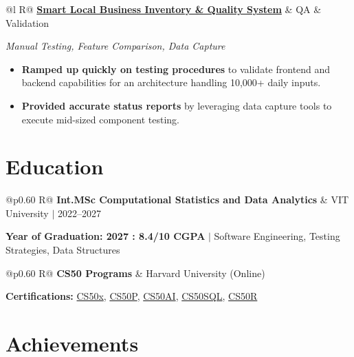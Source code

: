 \documentclass[a4paper,11pt]{article}
\newcommand{\subheading}[1]{\textbf{#1}}
\newcommand{\meta}[1]{{\fontsize{10}{12}\selectfont\textcolor[HTML]{3A3A3A}{#1}}}
\newcommand{\techstack}[1]{{\fontsize{10}{12}\selectfont\textcolor[HTML]{1A1A1A}{\textit{#1}}}}
\newcommand{\ulink}[2]{\href{#1}{#2}}
\begin{document}
\begin{tabularx}{\linewidth}{@{}l R@{}}
\subheading{\ulink{https://github.com/su-jin1425/Smart-Local-Business-Inventory-Billing-System}{Smart Local Business Inventory \& Quality System}} & \meta{QA \& Validation}
\end{tabularx}
\techstack{Manual Testing, Feature Comparison, Data Capture}
\begin{itemize}[nosep, leftmargin=1.5em, itemsep=2pt, topsep=2pt]
  \item {\color[HTML]{0A0A0A}\fontsize{11}{14}\selectfont \textbf{Ramped up quickly on testing procedures} to validate frontend and backend capabilities for an architecture handling 10,000+ daily inputs.}
  \item {\color[HTML]{0A0A0A}\fontsize{11}{14}\selectfont \textbf{Provided accurate status reports} by leveraging data capture tools to execute mid-sized component testing.}
\end{itemize}

\section{Education}
\vspace{2pt}

\begin{tabularx}{\linewidth}{@{}p{0.60\linewidth} R@{}}
\subheading{Int.MSc Computational Statistics and Data Analytics} & \meta{VIT University $|$ 2022--2027}
\end{tabularx}
{\color[HTML]{3A3A3A}\fontsize{11}{14}\selectfont \textbf{Year of Graduation: 2027 : 8.4/10 CGPA} $|$ Software Engineering, Testing Strategies, Data Structures}

\begin{tabularx}{\linewidth}{@{}p{0.60\linewidth} R@{}}
\subheading{CS50 Programs} & \meta{Harvard University (Online)}
\end{tabularx}
{\color[HTML]{3A3A3A}\fontsize{11}{14}\selectfont \textbf{Certifications:} \ulink{https://cs50.harvard.edu/certificates/b14b78df-e05c-413e-a607-1dd27303053a}{CS50x}, \ulink{https://cs50.harvard.edu/certificates/32477052-9db4-49c4-a5a4-d7e58429ca2c}{CS50P}, \ulink{https://cs50.harvard.edu/certificates/9cdb4d4a-1250-4f8e-9fd7-191864e0f919}{CS50AI}, \ulink{https://cs50.harvard.edu/certificates/bc486f24-f085-4e61-8536-80940b97a1b9}{CS50SQL}, \ulink{https://cs50.harvard.edu/certificates/666838e6-a053-4d82-b179-a60fe745fd84}{CS50R}}

\section{Achievements}
\vspace{2pt}
\end{document}
